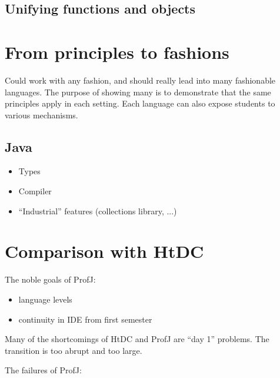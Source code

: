 \documentclass[submission,copyright]{eptcs}
\begin{document}
\subsection{Unifying functions and objects}

\section{From principles to fashions}

Could work with any fashion, and should really lead into many
fashionable languages.  The purpose of showing many is to demonstrate
that the same principles apply in each setting.  Each language can also
expose students to various mechanisms.

\subsection{Java}

\begin{itemize}
\item Types
\item Compiler
\item ``Industrial'' features (collections library, ...)
\end{itemize}


\section{Comparison with HtDC}

\cite{dvanhorn:Gray2003ProfessorJ}

\cite{dvanhorn:Allen2002DrJava}

\cite{dvanhorn:Kolling2003}

The noble goals of ProfJ:

\begin{itemize}
\item language levels
\item continuity in IDE from first semester
\end{itemize}

Many of the shortcomings of HtDC and ProfJ are ``day 1'' problems.
The transition is too abrupt and too large.

The failures of  ProfJ:
\end{document}
